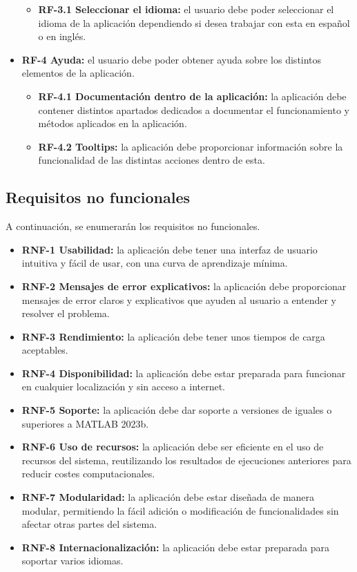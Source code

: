 \begin{itemize}
\begin{itemize}
        \item \textbf{RF-3.1 Seleccionar el idioma:} el usuario debe poder seleccionar el idioma de la aplicación dependiendo si desea trabajar con esta en español o en inglés. 
    \end{itemize}
    \item \textbf{RF-4 Ayuda:} el usuario debe poder obtener ayuda sobre los distintos elementos de la aplicación.
    \begin{itemize}
        \item \textbf{RF-4.1 Documentación dentro de la aplicación:} la aplicación debe contener distintos apartados dedicados a documentar el funcionamiento y métodos aplicados en la aplicación. 
        \item \textbf{RF-4.2 Tooltips:} la aplicación debe proporcionar información sobre la funcionalidad de las distintas acciones dentro de esta.
    \end{itemize}
\end{itemize}

\subsection{Requisitos no funcionales}\label{requisitos-no-funcionales}

A continuación, se enumerarán los requisitos no funcionales.

\begin{itemize}
    \item \textbf{RNF-1 Usabilidad:} la aplicación debe tener una interfaz de usuario intuitiva y fácil de usar, con una curva de aprendizaje mínima.
    \item \textbf{RNF-2 Mensajes de error explicativos:} la aplicación debe proporcionar mensajes de error claros y explicativos que ayuden al usuario a entender y resolver el problema.
    \item \textbf{RNF-3 Rendimiento:} la aplicación debe tener unos tiempos de carga aceptables.
    \item \textbf{RNF-4 Disponibilidad:} la aplicación debe estar preparada para funcionar en cualquier localización y sin acceso a internet.
    \item \textbf{RNF-5 Soporte:} la aplicación debe dar soporte a versiones de iguales o superiores a MATLAB 2023b.
    \item \textbf{RNF-6 Uso de recursos:} la aplicación debe ser eficiente en el uso de recursos del sistema, reutilizando los resultados de ejecuciones anteriores para reducir costes computacionales.
    \item \textbf{RNF-7 Modularidad:} la aplicación debe estar diseñada de manera modular, permitiendo la fácil adición o modificación de funcionalidades sin afectar otras partes del sistema.
    \item \textbf{RNF-8 Internacionalización:} la aplicación debe estar preparada para soportar varios idiomas.
\end{itemize}

